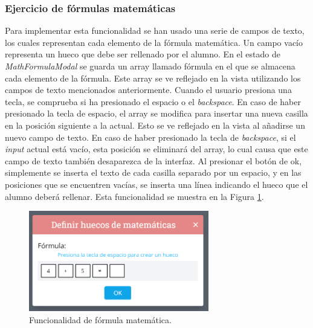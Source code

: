 \subsubsection{Ejercicio de fórmulas matemáticas}
\label{sec:impmatematica}
Para implementar esta funcionalidad se han usado una serie de campos de texto, los cuales representan cada elemento de la fórmula matemática. Un campo vacío representa un hueco que debe ser rellenado por el alumno. En el estado de \textit{MathFormulaModal} se guarda un array llamado fórmula en el que se almacena cada elemento de la fórmula. Este array se ve reflejado en la vista utilizando los campos de texto mencionados anteriormente. Cuando el usuario presiona una tecla, se comprueba si ha presionado el espacio o el \textit{backspace}. En caso de haber presionado la tecla de espacio, el array se modifica para insertar una nueva casilla en la posición siguiente a la actual. Esto se ve reflejado en la vista al añadirse un nuevo campo de texto. En caso de haber presionado la tecla de \textit{backspace}, si el \textit{input} actual está vacío, esta posición se eliminará del array, lo cual causa que este campo de texto también desaparezca de la interfaz. Al presionar el botón de ok, simplemente se inserta el texto de cada casilla separado por un espacio, y en las posiciones que se encuentren vacías, se inserta una línea indicando el hueco que el alumno deberá rellenar. Esta funcionalidad se muestra en la Figura \ref{fig:funcionalidadFormulaMatematica}.

\begin{figure}[ht!]
  \centering
  \includegraphics[width=0.7\textwidth]{Imagenes/Funcionalidades/MathFormulaModal.PNG}
  \caption{Funcionalidad de fórmula matemática.}
  \label{fig:funcionalidadFormulaMatematica}
\end{figure}

